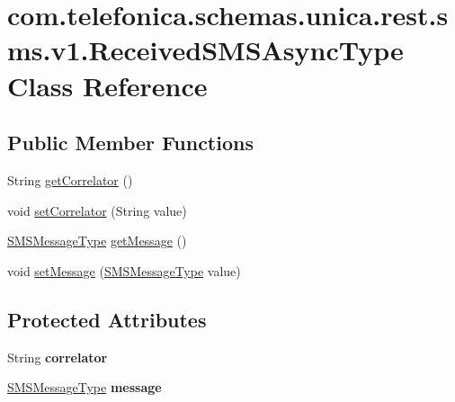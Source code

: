 \hypertarget{classcom_1_1telefonica_1_1schemas_1_1unica_1_1rest_1_1sms_1_1v1_1_1ReceivedSMSAsyncType}{
\section{com.telefonica.schemas.unica.rest.sms.v1.ReceivedSMSAsyncType Class Reference}
\label{classcom_1_1telefonica_1_1schemas_1_1unica_1_1rest_1_1sms_1_1v1_1_1ReceivedSMSAsyncType}
}
\subsection*{Public Member Functions}
\begin{DoxyCompactItemize}
\item 
String \hyperlink{classcom_1_1telefonica_1_1schemas_1_1unica_1_1rest_1_1sms_1_1v1_1_1ReceivedSMSAsyncType_a099810234d142f9ff19bc16788dba0c5}{getCorrelator} ()
\item 
void \hyperlink{classcom_1_1telefonica_1_1schemas_1_1unica_1_1rest_1_1sms_1_1v1_1_1ReceivedSMSAsyncType_a7223b0933029922dd9dcd8bb4f9eaf9c}{setCorrelator} (String value)
\item 
\hyperlink{classcom_1_1telefonica_1_1schemas_1_1unica_1_1rest_1_1sms_1_1v1_1_1SMSMessageType}{SMSMessageType} \hyperlink{classcom_1_1telefonica_1_1schemas_1_1unica_1_1rest_1_1sms_1_1v1_1_1ReceivedSMSAsyncType_ab4fed4db4584573bfb70e414c4cd2fb2}{getMessage} ()
\item 
void \hyperlink{classcom_1_1telefonica_1_1schemas_1_1unica_1_1rest_1_1sms_1_1v1_1_1ReceivedSMSAsyncType_a39e9c2977e22090d8fa1af5b2c2a6eab}{setMessage} (\hyperlink{classcom_1_1telefonica_1_1schemas_1_1unica_1_1rest_1_1sms_1_1v1_1_1SMSMessageType}{SMSMessageType} value)
\end{DoxyCompactItemize}
\subsection*{Protected Attributes}
\begin{DoxyCompactItemize}
\item 
\hypertarget{classcom_1_1telefonica_1_1schemas_1_1unica_1_1rest_1_1sms_1_1v1_1_1ReceivedSMSAsyncType_ae68bc04b4d4d12612111986d43a8efb7}{
String {\bfseries correlator}}
\label{classcom_1_1telefonica_1_1schemas_1_1unica_1_1rest_1_1sms_1_1v1_1_1ReceivedSMSAsyncType_ae68bc04b4d4d12612111986d43a8efb7}

\item 
\hypertarget{classcom_1_1telefonica_1_1schemas_1_1unica_1_1rest_1_1sms_1_1v1_1_1ReceivedSMSAsyncType_ab0a38a5f5234a2186f4e0fc074b288f8}{
\hyperlink{classcom_1_1telefonica_1_1schemas_1_1unica_1_1rest_1_1sms_1_1v1_1_1SMSMessageType}{SMSMessageType} {\bfseries message}}
\label{classcom_1_1telefonica_1_1schemas_1_1unica_1_1rest_1_1sms_1_1v1_1_1ReceivedSMSAsyncType_ab0a38a5f5234a2186f4e0fc074b288f8}

\end{DoxyCompactItemize}


